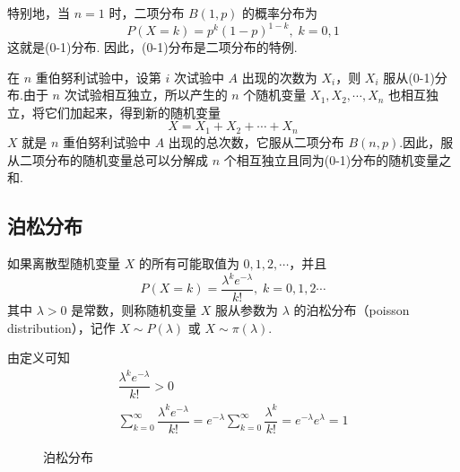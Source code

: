 特别地，当 $n=1$ 时，二项分布 $B(1,p)$ 的概率分布为
$$
P(X=k) = p^k (1-p)^{1-k}, \; k=0,1
$$
这就是(0-1)分布. 因此，(0-1)分布是二项分布的特例.

在 $n$ 重伯努利试验中，设第 $i$ 次试验中 $A$ 出现的次数为 $X_i$，则 $X_i$ 服从(0-1)分布.由于 $n$ 次试验相互独立，所以产生的 $n$ 个随机变量 $X_1, X_2, \cdots, X_n$ 也相互独立，将它们加起来，得到新的随机变量
$$
X = X_1 + X_2 + \cdots + X_n
$$
$X$ 就是 $n$ 重伯努利试验中 $A$ 出现的总次数，它服从二项分布 $B(n,p)$.因此，服从二项分布的随机变量总可以分解成 $n$ 个相互独立且同为(0-1)分布的随机变量之和.

\subsection{泊松分布}

\begin{definition}
    \indent 如果离散型随机变量 $X$ 的所有可能取值为 $0,1,2,\cdots$，并且
    $$
    P(X=k) = \dfrac{\lambda^k e^{-\lambda}}{k!}, \; k=0,1,2\cdots
    $$
    其中 $\lambda > 0$ 是常数，则称随机变量 $X$ 服从参数为 $\lambda$ 的{\heiti 泊松分布}（poisson distribution），记作 $X \sim P(\lambda)$ 或 $X \sim \pi(\lambda)$.
\end{definition}

由定义可知
\begin{gather*}
    \dfrac{\lambda^k e^{-\lambda}}{k!} > 0 \\
    \sum_{k=0}^\infty \dfrac{\lambda^k e^{-\lambda}}{k!} = e^{-\lambda} \sum_{k=0}^\infty \dfrac{\lambda^k}{k!} = e^{-\lambda} e^{\lambda} = 1
\end{gather*}

\begin{figure}[htbp]
    \centering


    \caption{泊松分布}
\end{figure}

